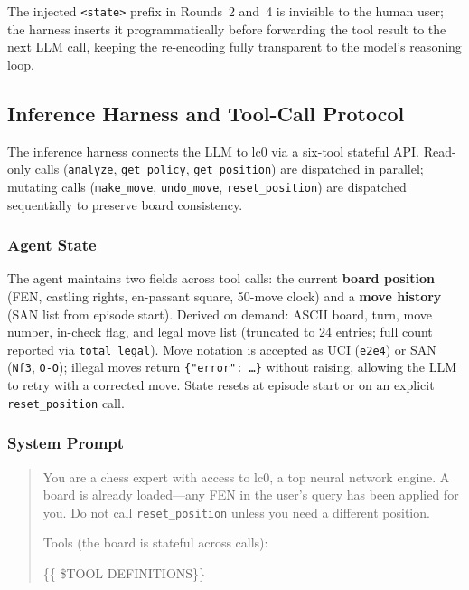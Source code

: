 \noindent The injected \texttt{<state>} prefix in Rounds~2 and~4 is invisible to the
human user; the harness inserts it programmatically before forwarding the tool result to
the next LLM call, keeping the re-encoding fully transparent to the model's reasoning loop.

\subsection{Inference Harness and Tool-Call Protocol}
\label{sec:app_toolcall}

The inference harness connects the LLM to lc0 via a six-tool stateful API.
Read-only calls (\texttt{analyze}, \texttt{get\_policy}, \texttt{get\_position}) are
dispatched in parallel; mutating calls (\texttt{make\_move}, \texttt{undo\_move},
\texttt{reset\_position}) are dispatched sequentially to preserve board consistency.

\subsubsection{Agent State}
\label{sec:app_toolcall_state}
\begin{tcolorbox}[statebox, title={Agent State}]
The agent maintains two fields across tool calls: the current \textbf{board position}
(FEN, castling rights, en-passant square, 50-move clock) and a \textbf{move history}
(SAN list from episode start).
Derived on demand: ASCII board, turn, move number, in-check flag, and legal move list
(truncated to 24 entries; full count reported via \texttt{total\_legal}).
Move notation is accepted as UCI (\texttt{e2e4}) or SAN (\texttt{Nf3}, \texttt{O-O});
illegal moves return \texttt{\{"error": \ldots\}} without raising, allowing the LLM to
retry with a corrected move.
State resets at episode start or on an explicit \texttt{reset\_position} call.
\end{tcolorbox}

\subsubsection{System Prompt}
\label{sec:app_toolcall_prompt}

\begin{tcolorbox}[promptbox, title={$\triangleright$\; System Prompt --- Chess Analyst}]
\begin{quote}
You are a chess expert with access to lc0, a top neural network engine.
A board is already loaded---any FEN in the user's query has been applied for you.
Do not call \texttt{reset\_position} unless you need a different position.

\smallskip
Tools (the board is stateful across calls):

\{\{ \$TOOL DEFINITIONS\}\}
\end{quote}
\end{tcolorbox}

